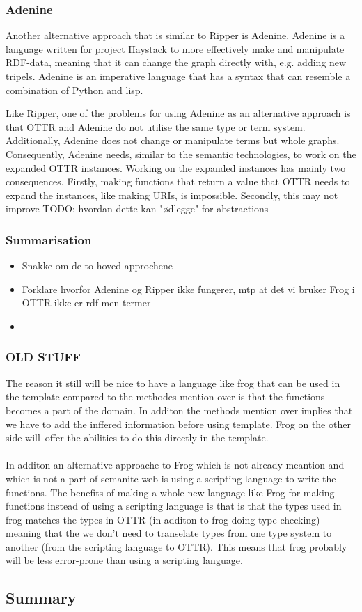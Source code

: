 \subsubsection{Adenine}
Another alternative approach that is similar to Ripper is Adenine. Adenine is a language written for project Haystack to more effectively make and manipulate RDF-data, meaning that it can change the graph directly with, e.g. adding new tripels. Adenine is an imperative language that has a syntax that can resemble a combination of Python and lisp. 

\para
Like Ripper, one of the problems for using Adenine as an alternative approach is that OTTR and Adenine do not utilise the same type or term system. Additionally, Adenine does not change or manipulate terms but whole graphs. Consequently, Adenine needs, similar to the semantic technologies, to work on the expanded OTTR instances. Working on the expanded instances has mainly two consequences. Firstly, making functions that return a value that OTTR needs to expand the instances, like making URIs, is impossible. Secondly, this may not improve   TODO: hvordan dette kan "ødlegge" for abstractions

\subsubsection{Summarisation}
\begin{itemize}
    \item Snakke om de to hoved approchene
    \item Forklare hvorfor Adenine og Ripper ikke fungerer, mtp at det vi bruker Frog i OTTR ikke er rdf men termer
    \item 
\end{itemize}

\subsubsection{OLD STUFF}
The reason it still will be nice to have a language like frog that can be used in the template compared to the 
methodes mention over is that the functions becomes a part of the domain. In additon the methods mention over implies
that we have to add the inffered information before using template. Frog on the other side will offer the abilities to 
do this directly in the template. 
\\ \\
In additon an alternative approache to Frog which is not already meantion and which is not a part of semanitc web 
is using a scripting language to write the functions.
The benefits of making a whole new language like Frog for making functions instead of using a scripting language is 
that is that the types used in frog matches the types in OTTR (in additon to frog doing type checking) meaning that 
the we don't need to transelate types from one type system to another (from the scripting language to OTTR). This means 
that frog probably will be less error-prone than using a scripting language.

\subsection{Summary}